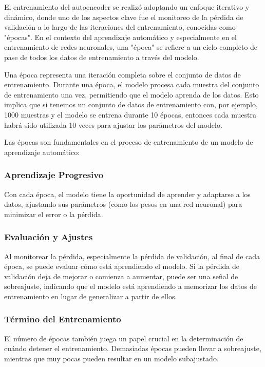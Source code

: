 El entrenamiento del autoencoder se realizó adoptando un enfoque iterativo y dinámico, donde uno de los aspectos clave fue el monitoreo de la pérdida de validación a lo largo de las iteraciones del entrenamiento, conocidas como "épocas". En el contexto del aprendizaje automático y especialmente en el entrenamiento de redes neuronales, una "época" se refiere a un ciclo completo de pase de todos los datos de entrenamiento a través del modelo.

Una época representa una iteración completa sobre el conjunto de datos de entrenamiento. Durante una época, el modelo procesa cada muestra del conjunto de entrenamiento una vez, permitiendo que el modelo aprenda de los datos. Esto implica que si tenemos un conjunto de datos de entrenamiento con, por ejemplo, 1000 muestras y el modelo se entrena durante 10 épocas, entonces cada muestra habrá sido utilizada 10 veces para ajustar los parámetros del modelo.

Las épocas son fundamentales en el proceso de entrenamiento de un modelo de aprendizaje automático:

\subsubsection{Aprendizaje Progresivo} 
Con cada época, el modelo tiene la oportunidad de aprender y adaptarse a los datos, ajustando sus parámetros (como los pesos en una red neuronal) para minimizar el error o la pérdida.

\subsubsection{Evaluación y Ajustes} 
Al monitorear la pérdida, especialmente la pérdida de validación, al final de cada época, se puede evaluar cómo está aprendiendo el modelo. Si la pérdida de validación deja de mejorar o comienza a aumentar, puede ser una señal de sobreajuste, indicando que el modelo está aprendiendo a memorizar los datos de entrenamiento en lugar de generalizar a partir de ellos.

\subsubsection{Término del Entrenamiento} 
El número de épocas también juega un papel crucial en la determinación de cuándo detener el entrenamiento. Demasiadas épocas pueden llevar a sobreajuste, mientras que muy pocas pueden resultar en un modelo subajustado.

